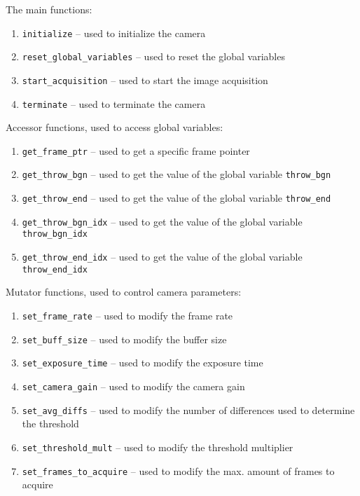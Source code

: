 The main functions:

\begin{enumerate}
  \item \texttt{initialize} -- used to initialize the camera
  \item \texttt{reset\_global\_variables} -- used to reset the global variables
  \item \texttt{start\_acquisition} -- used to start the image acquisition
  \item \texttt{terminate} -- used to terminate the camera
\end{enumerate}

Accessor functions, used to access global variables:

\begin{enumerate}
  \item \texttt{get\_frame\_ptr} -- used to get a specific frame pointer
  \item \texttt{get\_throw\_bgn} -- used to get the value of the global variable \texttt{throw\_bgn}
  \item \texttt{get\_throw\_end} -- used to get the value of the global variable \texttt{throw\_end}
  \item \texttt{get\_throw\_bgn\_idx} -- used to get the value of the global variable \texttt{throw\_bgn\_idx}
  \item \texttt{get\_throw\_end\_idx} -- used to get the value of the global variable \texttt{throw\_end\_idx}
\end{enumerate}

Mutator functions, used to control camera parameters:

\begin{enumerate}
  \item \texttt{set\_frame\_rate} -- used to modify the frame rate
  \item \texttt{set\_buff\_size} -- used to modify the buffer size
  \item \texttt{set\_exposure\_time} -- used to modify the exposure time
  \item \texttt{set\_camera\_gain} -- used to modify the camera gain
  \item \texttt{set\_avg\_diffs} -- used to modify the number of differences used to determine the threshold
  \item \texttt{set\_threshold\_mult} -- used to modify the threshold multiplier
  \item \texttt{set\_frames\_to\_acquire} -- used to modify the max. amount of frames to acquire
\end{enumerate}
